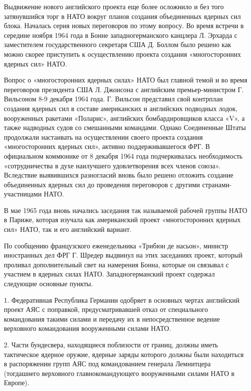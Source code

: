 \documentclass[12pt, a4paper, openany]{book}
\begin{document}
		Выдвижение нового английского проекта еще более осложнило и без того затянувшийся торг в НАТО вокруг планов создания объединенных ядерных сил блока. Началась серия новых переговоров по этому вопросу. Во время встречи в середине ноября 1964 года в Бонне западногерманского канцлера Л. Эрхарда с заместителем государственного секретаря США Д. Боллом было решено как можно скорее приступить к осуществлению проекта создания «многосторонних ядерных сил» НАТО.
		
		Вопрос о «многосторонних ядерных силах» НАТО был главной темой и во время переговоров президента США Л. Джонсона с английским премьер-министром Г. Вильсоном 8-9 декабря 1964 года. Г. Вильсон представил свой контрплан создания ядерных сил в составе американских и английских подводных лодок, вооруженных ракетами «Поларис», английских бомбардировщиков класса «V», а также надводных судов со смешанными командами. Однако Соединенные Штаты продолжали настаивать на осуществлении своего проекта создания «многосторонних ядерных сил», активно поддерживавшегося ФРГ. В официальном коммюнике от 8 декабря 1964 года подчеркивалась необходимость «сотрудничества в духе наилучшего удовлетворения всех членов союза». Вследствие выявившихся разногласий вновь было решено отложить создание объединенных ядерных сил до проведения переговоров с другими странами-участницами НАТО.
		
		В мае 1965 года вновь начались заседания так называемой рабочей группы НАТО в Париже, которая изучала как американский проект «многосторонних ядерных сил» НАТО, так и его английский вариант.
		
		По сообщению французского еженедельника «Трибюн де насьон», министр иностранных дел ФРГ Г. Шредер выдвинул на этих заседаниях проект, который проливал дополнительный свет на намерения Бонна, которые он связывал с участием в ядерных силах НАТО. Западногерманский проект содержал следующие основные пункты.
		
		1. Федеративная Республика Германии одобряет в основных чертах английский проект АЯС с поправкой, предусматривавшей отказ от специального командования такими силами и передачу их в непосредственное ведение верховного командования вооруженными силами НАТО.
		
		2. Части бундесвера, находящиеся поблизости от границ, должны иметь тактическое ядерное оружие, ядерные заряды которого должны были находиться в распоряжении групп АЯС под командованием генерала Лемнитцера (тогдашнего верховного главнокомандующего вооруженными силами НАТО в Европе).
		
\end{document}
